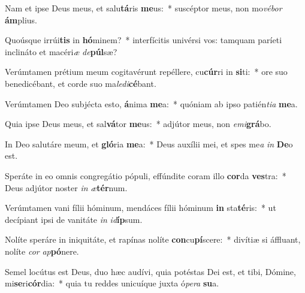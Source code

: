 \item Nam et ipse Deus meus, et salu\textbf{tá}ris \textbf{me}us:~* suscéptor meus, non mo\textit{vé}\textit{bor} \textbf{ám}plius.
\item Quoúsque irrúi\textbf{tis} in \textbf{hó}minem?~* interfícitis univérsi vos: tamquam paríeti inclináto et macéri\textit{æ} \textit{de}\textbf{púl}sæ?
\item Verúmtamen prétium meum cogitavérunt repéllere, cu\textbf{cúr}ri in \textbf{si}ti:~* ore suo benedicébant, et corde suo ma\textit{le}\textit{di}\textbf{cé}bant.
\item Verúmtamen Deo subjécta esto, \textbf{á}nima \textbf{me}a:~* quóniam ab ipso patién\textit{ti}\textit{a} \textbf{me}a.
\item Quia ipse Deus meus, et sal\textbf{vá}tor \textbf{me}us:~* adjútor meus, non \textit{e}\textit{mi}\textbf{grá}bo.
\item In Deo salutáre meum, et \textbf{gló}ria \textbf{me}a:~* Deus auxílii mei, et spes me\textit{a} \textit{in} \textbf{De}o est.
\item Speráte in eo omnis congregátio pópuli, effúndite coram illo \textbf{cor}da \textbf{ves}tra:~* Deus adjútor noster \textit{in} \textit{æ}\textbf{tér}num.
\item Verúmtamen vani fílii hóminum, mendáces fílii hóminum \textbf{in} sta\textbf{té}ris:~* ut decípiant ipsi de vanitáte \textit{in} \textit{id}\textbf{íp}sum.
\item Nolíte speráre in iniquitáte, et rapínas nolíte \textbf{con}cu\textbf{pí}scere:~* divítiæ si áffluant, nolíte \textit{cor} \textit{ap}\textbf{pó}nere.
\item Semel locútus est Deus, duo hæc audívi, quia potéstas Dei est, et tibi, Dómine, mi\textbf{se}ri\textbf{cór}dia:~* quia tu reddes unicuíque juxta ó\textit{pe}\textit{ra} \textbf{su}a.

